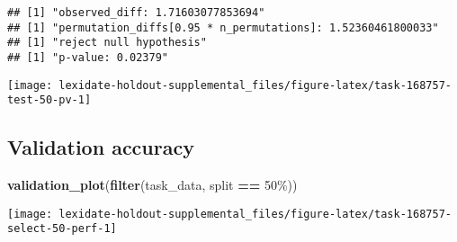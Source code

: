 \documentclass[
]{book}
\newenvironment{Shaded}{\begin{snugshade}}{\end{snugshade}}
\newcommand{\AttributeTok}[1]{\textcolor[rgb]{0.13,0.29,0.53}{#1}}
\newcommand{\DecValTok}[1]{\textcolor[rgb]{0.00,0.00,0.81}{#1}}
\newcommand{\FunctionTok}[1]{\textcolor[rgb]{0.13,0.29,0.53}{\textbf{#1}}}
\newcommand{\NormalTok}[1]{#1}
\newcommand{\OtherTok}[1]{\textcolor[rgb]{0.56,0.35,0.01}{#1}}
\newcommand{\SpecialCharTok}[1]{\textcolor[rgb]{0.81,0.36,0.00}{\textbf{#1}}}
\newcommand{\StringTok}[1]{\textcolor[rgb]{0.31,0.60,0.02}{#1}}
\begin{document}
\begin{Shaded}
\end{Shaded}

\begin{verbatim}
## [1] "observed_diff: 1.71603077853694"
## [1] "permutation_diffs[0.95 * n_permutations]: 1.52360461800033"
## [1] "reject null hypothesis"
## [1] "p-value: 0.02379"
\end{verbatim}

\texttt{[image: lexidate-holdout-supplemental\_files/figure-latex/task-168757-test-50-pv-1]}

\hypertarget{validation-accuracy-22}{%
\subsection{Validation accuracy}\label{validation-accuracy-22}}

\begin{Shaded}
\begin{Highlighting}[]
\FunctionTok{validation\_plot}\NormalTok{(}\FunctionTok{filter}\NormalTok{(task\_data, split }\SpecialCharTok{==} \StringTok{\textquotesingle{}50\%\textquotesingle{}}\NormalTok{))}
\end{Highlighting}
\end{Shaded}

\texttt{[image: lexidate-holdout-supplemental\_files/figure-latex/task-168757-select-50-perf-1]}
\end{document}
